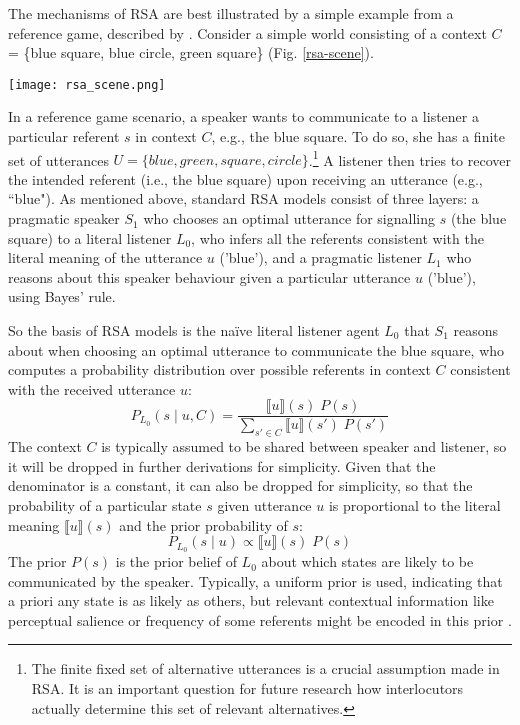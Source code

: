 The mechanisms of RSA are best illustrated by a simple example from a reference game, described by \textcite{frank2012predicting}.
Consider a simple world consisting of a context $C$ = \{blue square, blue circle, green square\} (Fig. \ref{rsa-scene}).
\begin{figure*}[t]
	\begin{center}
		\texttt{[image: rsa\_scene.png]}
	\end{center}
	\vspace{-0.3cm}
	\caption{A simple reference resolution example scenario: the context $C$ consists of three possible referents \parencite{frank2012predicting}}
	\label{rsa-scene}
\end{figure*}
In a reference game scenario, a speaker wants to communicate to a listener a particular referent $s$ in context $C$, e.g., the blue square. To do so, she has a finite set of utterances $U = \{blue, green, square, circle\}$.\footnote{The finite fixed set of alternative utterances is a crucial assumption made in RSA. It is an important question for future research how interlocutors actually determine this set of relevant alternatives.} A listener then tries to recover the intended referent (i.e., the blue square) upon receiving an utterance (e.g., ``blue"). 
As mentioned above, standard RSA models consist of three layers: a pragmatic speaker $S_1$ who chooses an optimal utterance for signalling $s$ (the blue square) to a literal listener $L_0$, who infers all the referents consistent with the literal meaning of the utterance $u$ ('blue'), and a pragmatic listener $L_1$ who reasons about this speaker behaviour given a particular utterance $u$ ('blue'), using Bayes' rule.

So the basis of RSA models is the na\"ive literal listener agent $L_0$ that $S_1$ reasons about when choosing an optimal utterance to communicate the blue square, who computes a probability distribution over possible referents in context $C$  consistent with the received utterance $u$: %
\begin{equation}
P_{L_0}(s \mid u, C) = \frac{\llbracket u \rrbracket (s) \; P(s)}{\sum_{s' \in C} \llbracket u \rrbracket (s') \; P(s')}
\end{equation}
The context $C$ is typically assumed to be shared between speaker and listener, so it will be dropped in further derivations for simplicity. Given that the denominator is a constant, it can also be dropped for simplicity, so that the probability of a particular state $s$ given utterance $u$ is proportional to the literal meaning $\llbracket u \rrbracket (s)$ and the prior probability of $s$: 
\begin{equation}
P_{L_0}(s \mid u) \propto \llbracket u \rrbracket (s) \; P(s)
\end{equation}
The prior $P(s)$ is the prior belief of $L_0$ about which states are likely to be communicated by the speaker. Typically, a uniform prior is used, indicating that a priori any state is as likely as others, but relevant contextual information like perceptual salience or frequency of some referents might be encoded in this prior \parencite{frank2012predicting}.

